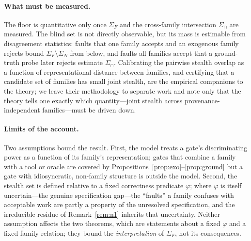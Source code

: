 \documentclass[11pt]{article}
\theoremstyle{definition}
\theoremstyle{remark}
\newcommand{\SigF}{\Sigma_{F}}
\newcommand{\SigN}{\Sigma_{N}}
\begin{document}
\paragraph{What must be measured.}
The floor is quantitative only once $\SigF$ and the cross-family intersection $\Sigma_{\cap}$ are
measured. The blind set is not directly observable, but its mass is estimable from disagreement
statistics: faults that one family accepts and an exogenous family rejects bound $\SigF\setminus\SigN$
from below, and faults all families accept that a ground-truth probe later rejects estimate
$\Sigma_{\cap}$. Calibrating the pairwise stealth overlap as a function of representational distance
between families, and certifying that a candidate set of families has small joint stealth, are the
empirical companions to the theory; we leave their methodology to separate work and note only that the
theory tells one exactly which quantity---joint stealth across provenance-independent families---must
be driven down.

\paragraph{Limits of the account.}
Two assumptions bound the result. First, the model treats a gate's discriminating power as a function
of its family's representation; gates that combine a family with a tool or oracle are covered by
Propositions~\ref{prop:exo}--\ref{prop:ground} but a gate with idiosyncratic, non-family structure is
outside the model. Second, the stealth set is defined relative to a fixed correctness predicate
$\varphi$; where $\varphi$ is itself uncertain---the genuine specification gap---the ``faults'' a
family confuses with acceptable work are partly a property of the unresolved specification, and the
irreducible residue of Remark~\ref{rem:n1} inherits that uncertainty. Neither assumption affects the
two theorems, which are statements about a fixed $\varphi$ and a fixed family relation; they bound the
\emph{interpretation} of $\SigF$, not its consequences.
\end{document}
